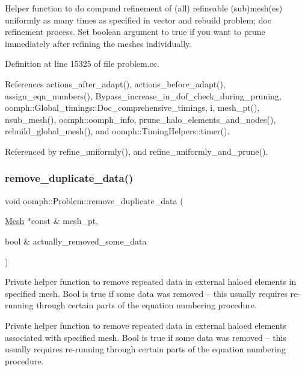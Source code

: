 Helper function to do compund refinement of (all) refineable (sub)mesh(es) uniformly as many times as specified in vector and rebuild problem; doc refinement process. Set boolean argument to true if you want to prune immediately after refining the meshes individually. 

Definition at line 15325 of file problem.\+cc.



References actions\+\_\+after\+\_\+adapt(), actions\+\_\+before\+\_\+adapt(), assign\+\_\+eqn\+\_\+numbers(), Bypass\+\_\+increase\+\_\+in\+\_\+dof\+\_\+check\+\_\+during\+\_\+pruning, oomph\+::\+Global\+\_\+timings\+::\+Doc\+\_\+comprehensive\+\_\+timings, i, mesh\+\_\+pt(), nsub\+\_\+mesh(), oomph\+::oomph\+\_\+info, prune\+\_\+halo\+\_\+elements\+\_\+and\+\_\+nodes(), rebuild\+\_\+global\+\_\+mesh(), and oomph\+::\+Timing\+Helpers\+::timer().



Referenced by refine\+\_\+uniformly(), and refine\+\_\+uniformly\+\_\+and\+\_\+prune().

\mbox{\label{classoomph_1_1Problem_a088570d2600c2e710da2717e9ed35404}} 
\subsubsection{\texorpdfstring{remove\+\_\+duplicate\+\_\+data()}{remove\_duplicate\_data()}}
{\footnotesize\ttfamily void oomph\+::\+Problem\+::remove\+\_\+duplicate\+\_\+data (\begin{DoxyParamCaption}\item[{\hyperlink{classoomph_1_1Mesh}{Mesh} $\ast$const \&}]{mesh\+\_\+pt,  }\item[{bool \&}]{actually\+\_\+removed\+\_\+some\+\_\+data }\end{DoxyParamCaption})\hspace{0.3cm}{\ttfamily [private]}}



Private helper function to remove repeated data in external haloed elements in specified mesh. Bool is true if some data was removed -- this usually requires re-\/running through certain parts of the equation numbering procedure. 

Private helper function to remove repeated data in external haloed elements associated with specified mesh. Bool is true if some data was removed -- this usually requires re-\/running through certain parts of the equation numbering procedure. 

